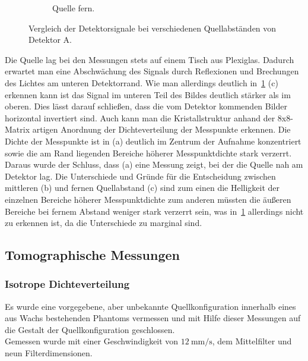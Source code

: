 \documentclass[slug=PET, room=Andreas-Schubert-Bau\,\ 424A, supervisor=Carsten\ Bittrich, coursedate=10.\ 01.\ 2020]{../../Lab_Report_LaTeX/lab_report}
\begin{document}
\begin{figure}[h!]
\begin{subfigure}{0.32\textwidth}
		\caption{Quelle fern.}
	\end{subfigure}
	\caption{Vergleich der Detektorsignale bei verschiedenen Quellabständen von Detektor A.}
	\label{fig:abstand}
\end{figure}

Die Quelle lag bei den Messungen stets auf einem Tisch aus Plexiglas. Dadurch erwartet man eine
Abschwächung des Signals durch Reflexionen und Brechungen des Lichtes am unteren Detektorrand.
Wie man allerdings deutlich in~\ref{fig:abstand} (c) erkennen kann ist das Signal im unteren
Teil des Bildes deutlich stärker als im oberen. Dies lässt darauf schließen, dass die vom
Detektor kommenden Bilder horizontal invertiert sind.
Auch kann man die Kristallstruktur anhand der 8x8-Matrix artigen Anordnung der Dichteverteilung
der Messpunkte erkennen.
Die Dichte der Messpunkte ist in (a) deutlich im Zentrum der Aufnahme
konzentriert sowie die am Rand liegenden Bereiche höherer Messpunktdichte stark verzerrt. Daraus
wurde der Schluss, dass (a) eine Messung zeigt, bei der die Quelle nah am Detektor lag.
Die Unterschiede und Gründe für die Entscheidung zwischen mittleren (b) und fernen Quellabstand 
(c) sind zum einen die Helligkeit der einzelnen Bereiche höherer Messpunktdichte zum anderen
müssten die äußeren Bereiche bei fernem Abstand weniger stark verzerrt sein, was 
in~\ref{fig:abstand} allerdings nicht zu erkennen ist, da die Unterschiede zu marginal sind.

\subsection{Tomographische Messungen}
\label{sec:tom}

\subsubsection{Isotrope Dichteverteilung}
\label{sec:tom1}

Es wurde eine vorgegebene, aber unbekannte Quellkonfiguration innerhalb eines aus Wachs 
bestehenden Phantoms vermessen und mit Hilfe dieser Messungen auf die Gestalt der
Quellkonfiguration geschlossen.\\

Gemessen wurde mit einer Geschwindigkeit von \(\SI{12}{\milli\metre\per\second}\), dem 
Mittelfilter und neun Filterdimensionen.
\end{document}
